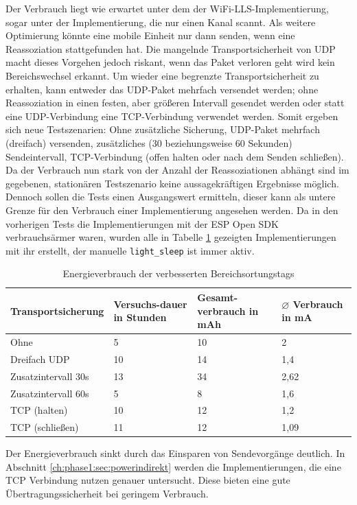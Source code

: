 Der Verbrauch liegt wie erwartet unter dem der WiFi-LLS-Implementierung, sogar unter der Implementierung, die nur einen Kanal scannt.
Als weitere Optimierung könnte eine mobile Einheit nur dann senden, wenn eine Reassoziation stattgefunden hat.
Die mangelnde Transportsicherheit von UDP macht dieses Vorgehen jedoch riskant, wenn das Paket verloren geht wird kein Bereichswechsel erkannt.
Um wieder eine begrenzte Transportsicherheit zu erhalten, kann entweder das UDP-Paket mehrfach versendet werden; ohne Reassoziation in einen festen, aber größeren Intervall gesendet werden oder statt eine UDP-Verbindung eine TCP-Verbindung verwendet werden.
Somit ergeben sich neue Testszenarien: Ohne zusätzliche Sicherung, UDP-Paket mehrfach (dreifach) versenden, zusätzliches (30 beziehungsweise 60 Sekunden) Sendeintervall, TCP-Verbindung (offen halten oder nach dem Senden schließen). \\
Da der Verbrauch nun stark von der Anzahl der Reassoziationen abhängt sind im gegebenen, stationären Testszenario keine aussagekräftigen Ergebnisse möglich.
Dennoch sollen die Tests einen Ausgangswert ermitteln, dieser kann als untere Grenze für den Verbrauch einer Implementierung angesehen werden.
Da in den vorherigen Tests die Implementierungen mit der ESP Open SDK verbrauchsärmer waren, wurden alle in Tabelle \ref{table:naiveoptconsumption} gezeigten Implementierungen mit ihr erstellt, der manuelle \texttt{light\_sleep} ist immer aktiv.

\begin{table}[h]
	\centering
	\caption{Energieverbrauch der verbesserten Bereichsortungstags}
	\label{table:naiveoptconsumption}
	\begin{tabular}{p{3.5cm}|p{1.7cm}|p{2.5cm}|p{2.5cm}}
		Transportsicherung & Versuchs-dauer in Stunden & Gesamt-verbrauch in mAh & $\varnothing$ Verbrauch in mA \\
		\hline
		Ohne & 5 & 10 & 2 \\
		Dreifach UDP & 10 & 14 & 1,4 \\
		Zusatzintervall 30s & 13 & 34 & 2,62 \\
		Zusatzintervall 60s & 5 & 8 & 1,6 \\
		TCP (halten) & 10 & 12 & 1,2 \\
		TCP (schließen) & 11 & 12 & 1,09 \\
	\end{tabular}
\end{table}

Der Energieverbrauch sinkt durch das Einsparen von Sendevorgänge deutlich.
In Abschnitt \ref{ch:phase1:sec:powerindirekt} werden die Implementierungen, die eine TCP Verbindung nutzen genauer untersucht.
Diese bieten eine gute Übertragungssicherheit bei geringem Verbrauch.


